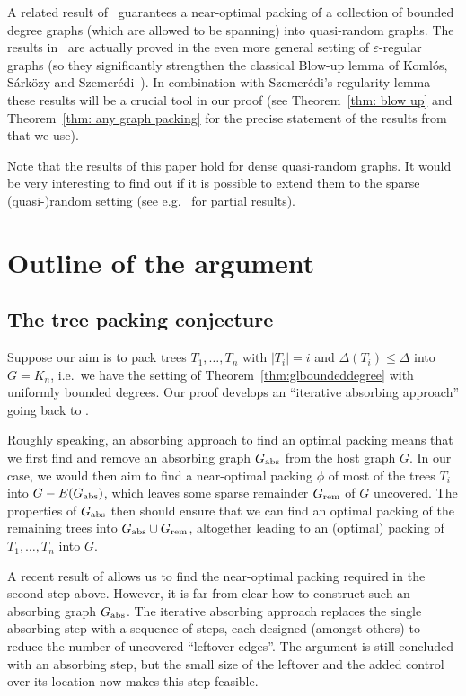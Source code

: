 \documentclass[a4paper, 11pt, reqno]{amsart}
\numberwithin{equation}{section}
\newcommand{\1}{{\rm 1\hspace*{-0.4ex}%
\rule{0.1ex}{1.52ex}\hspace*{0.2ex}}}
\renewcommand{\epsilon}{\varepsilon}
\newcounter{step}
\begin{document}
A related result of~\cite{KKOT16} guarantees a near-optimal packing of a collection of bounded degree graphs (which are allowed to be spanning) into quasi-random graphs.
The results in~\cite{KKOT16} are actually proved in the even more general setting of $\epsilon$-regular graphs
(so they significantly strengthen the classical Blow-up lemma of Koml{\'o}s, S{\'a}rk{\"o}zy and Szemer{\'e}di~\cite{KSS97}). 
In combination with Szemer\'{e}di's regularity lemma these results will be a crucial tool in our proof 
(see Theorem~\ref{thm: blow up} and Theorem~\ref{thm: any graph packing} for the precise statement of the results from~\cite{KKOT16} that we use).


Note that the results of this paper hold for dense quasi-random graphs. 
It would be very interesting to find out if it is possible to extend them to the sparse (quasi-)random setting (see e.g.~\cite{BFKL14} for partial results).

\section{Outline of the argument}
\subsection{The tree packing conjecture}
Suppose our aim is to pack trees $T_1,\dots, T_n$ with $|T_i|=i$ and $\Delta(T_i)\leq \Delta$ into $G=K_n$, i.e.~we have the setting of Theorem~\ref{thm:glboundeddegree} with uniformly bounded degrees. 
Our proof develops an ``iterative absorbing approach'' going back to \cite{KKO15}.

Roughly speaking, an absorbing approach to find an optimal packing means that we first find and remove an absorbing graph $G_{\rm abs}$ from the host graph $G$. 
In our case, we would then aim to find a near-optimal packing $\phi$ of most of the trees $T_i$ into $G-E(G_{\rm abs})$, which leaves some sparse remainder $G_{\rm rem}$ of $G$ uncovered. 
The properties of $G_{\rm abs}$ then should ensure that we can find an optimal packing of the remaining trees into $G_{\rm abs}\cup G_{\rm rem}$, altogether leading to an (optimal) packing of $T_1,\dots, T_n$ into $G$.

A recent result of \cite{KKOT16} allows us to find the near-optimal packing required in the second step above. 
However, it is far from clear how to construct such an absorbing graph $G_{\rm abs}$. 
The iterative absorbing approach replaces the single absorbing step with a sequence of steps, each designed (amongst others) to reduce the number of uncovered ``leftover edges''. The argument is still concluded with an absorbing step, but the small size of the leftover and the added control over its location now makes this step feasible.
\end{document}
